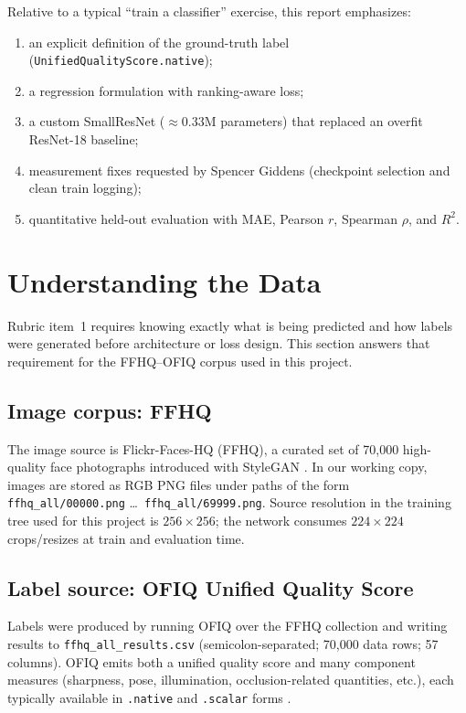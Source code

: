 \documentclass[12pt, letterpaper, titlepage]{article}
\begin{document}
Relative to a typical ``train a classifier'' exercise, this report emphasizes:
\begin{enumerate}[leftmargin=*]
    \item an explicit definition of the ground-truth label (\texttt{UnifiedQualityScore.native});
    \item a regression formulation with ranking-aware loss;
    \item a custom SmallResNet ($\approx 0.33$M parameters) that replaced an overfit ResNet-18 baseline;
    \item measurement fixes requested by Spencer Giddens (checkpoint selection and clean train logging);
    \item quantitative held-out evaluation with MAE, Pearson $r$, Spearman $\rho$, and $R^2$.
\end{enumerate}

\FloatBarrier
\section{Understanding the Data}
\label{sec:data}

Rubric item~1 requires knowing exactly what is being predicted and how labels were generated before architecture or loss design. This section answers that requirement for the FFHQ--OFIQ corpus used in this project.

\subsection{Image corpus: FFHQ}

The image source is Flickr-Faces-HQ (FFHQ), a curated set of 70{,}000 high-quality face photographs introduced with StyleGAN \citep{karras2019stylegan}. In our working copy, images are stored as RGB PNG files under paths of the form \texttt{ffhq\_all/00000.png} \ldots\ \texttt{ffhq\_all/69999.png}. Source resolution in the training tree used for this project is $256\times 256$; the network consumes $224\times 224$ crops/resizes at train and evaluation time.

\subsection{Label source: OFIQ Unified Quality Score}

Labels were produced by running OFIQ over the FFHQ collection and writing results to \texttt{ffhq\_all\_results.csv} (semicolon-separated; 70{,}000 data rows; 57 columns). OFIQ emits both a unified quality score and many component measures (sharpness, pose, illumination, occlusion-related quantities, etc.), each typically available in \texttt{.native} and \texttt{.scalar} forms \citep{bsi2024ofiq}.
\end{document}
